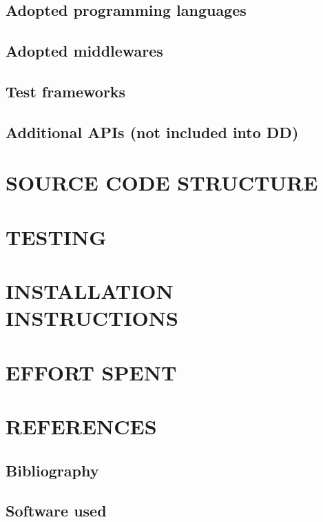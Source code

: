 \documentclass[11pt]{report}
\begin{document}
		\section{Adopted programming languages}
		\label{sect:Adopted programming languages}
			
			
		\section{Adopted middlewares}
		\label{sect:Adopted middlewares}
			
		
		\section{Test frameworks}
		\label{sect:Test frameworks}
			
			
		\section{Additional APIs (not included into DD)}
		\label{sect:Additional APIs (not included into DD)}
			
	
	\chapter{SOURCE CODE STRUCTURE}
	\label{ch:SOURCE CODE STRUCTURE}	
		
	
	\chapter{TESTING}
	\label{ch:TESTING}	
		
	
	\chapter{INSTALLATION INSTRUCTIONS}
	\label{ch:INSTALLATION INSTRUCTIONS}	
		
	
	\chapter{EFFORT SPENT}
	\label{ch:EFFORT SPENT}
		
		
	\chapter{REFERENCES}
	\label{ch:REFERENCES}
	
		\section{Bibliography}
		\label{sect: Bibliography}
		
		
		\section{Software used}
		\label{sect: Software used}
		
		
\end{document}
